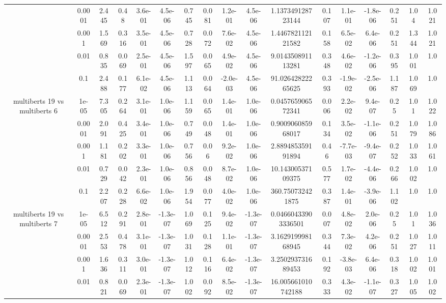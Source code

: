\begin{tabular}{|c|c|c|c|c|c|c|c|c|c|c|c|c|c|c|c|c|}
 & 0.0001 & 2.445 & 0.48 & 3.6e-01 & 4.5e-06 & 0.745 & 0.081 & 1.2e-01 & 4.5e-06 & 1.137349128723144 & 0.107 & 1.1e-01 & -1.8e-06 & 0.251 & 1.04 & 1.021 \\
 & 0.001 & 1.569 & 0.316 & 3.5e-01 & 4.5e-06 & 0.728 & 0.072 & 7.6e-02 & 4.5e-06 & 1.446782112121582 & 0.158 & 6.5e-02 & 6.4e-06 & 0.251 & 1.344 & 1.021 \\
 & 0.01 & 0.835 & 0.069 & 2.5e-01 & 4.5e-06 & 1.597 & 0.065 & 4.9e-02 & 4.5e-06 & 9.014350891113281 & 0.348 & 4.6e-02 & -1.2e-06 & 0.395 & 1.001 & 1.0 \\
 & 0.1 & 2.488 & 0.177 & 6.1e-02 & 4.5e-06 & 1.113 & 0.064 & -2.0e-03 & 4.5e-06 & 91.02642822265625 & 0.393 & -1.9e-02 & -2.5e-06 & 1.187 & 1.069 & 1.0 \\
\hline
\multirow{5}{*}{multiberts 19 vs multiberts 6} & 1e-05 & 7.305 & 0.264 & 3.1e-01 & 1.0e-06 & 1.159 & 0.065 & 1.4e-01 & 1.0e-06 & 0.045765906572341 & 0.006 & 2.2e-02 & 9.4e-07 & 0.25 & 1.01 & 1.022 \\
 & 0.0001 & 2.091 & 0.425 & 3.4e-01 & 1.0e-06 & 0.749 & 0.048 & 1.4e-01 & 1.0e-06 & 0.900906085968017 & 0.134 & 3.5e-02 & -1.1e-06 & 0.251 & 1.079 & 1.086 \\
 & 0.001 & 1.181 & 0.202 & 3.3e-01 & 1.0e-06 & 0.756 & 0.06 & 9.2e-02 & 1.0e-06 & 2.889485359191894 & 0.46 & -7.7e-03 & -9.4e-07 & 0.252 & 1.033 & 1.061 \\
 & 0.01 & 0.729 & 0.042 & 2.3e-01 & 1.0e-06 & 0.856 & 0.048 & 8.7e-02 & 1.0e-06 & 10.14300537109375 & 0.577 & 1.7e-02 & -4.4e-06 & 0.266 & 1.002 & 1.0 \\
 & 0.1 & 2.207 & 0.228 & 6.6e-02 & 1.0e-06 & 1.954 & 0.077 & 4.0e-02 & 1.0e-06 & 360.750732421875 & 0.387 & 1.4e-01 & -3.9e-06 & 1.102 & 1.0 & 1.0 \\
\hline
\multirow{5}{*}{multiberts 19 vs multiberts 7} & 1e-05 & 6.512 & 0.291 & 2.8e-01 & -1.3e-07 & 1.069 & 0.125 & 9.4e-02 & -1.3e-07 & 0.04660433903336501 & 0.007 & 4.8e-02 & 2.0e-06 & 0.25 & 1.01 & 1.036 \\
 & 0.0001 & 2.553 & 0.478 & 3.1e-01 & -1.3e-07 & 1.031 & 0.128 & 1.1e-01 & -1.3e-07 & 3.162919998168945 & 0.344 & 7.3e-02 & 4.2e-06 & 0.251 & 1.027 & 1.011 \\
 & 0.001 & 1.636 & 0.311 & 3.0e-01 & -1.3e-07 & 1.012 & 0.116 & 6.4e-02 & -1.3e-07 & 3.250293731689453 & 0.192 & -3.8e-03 & 6.4e-06 & 0.318 & 1.002 & 1.001 \\
 & 0.01 & 0.821 & 0.069 & 2.3e-01 & -1.3e-07 & 1.002 & 0.092 & 8.5e-02 & -1.3e-07 & 16.005661010742188 & 0.333 & 4.3e-02 & -1.1e-07 & 0.327 & 1.005 & 1.002 \\

\end{tabular}
